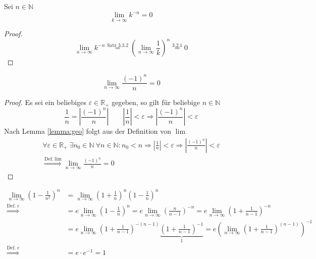 \documentclass[a4paper, 12pt]{scrartcl}
\newcommand{\defimpl}[1]{\stackrel{\text{Def.}\;#1}{\Longrightarrow}}
\begin{document}
\begin{lemma}\label{lemma:geo}
Sei $n \in \mathbb{N}$
\[ \lim_{k \rightarrow \infty} k^{-n} = 0 \]
\end{lemma}
\begin{proof}
\[ \lim_{n \rightarrow \infty} k^{-n} \stackrel{\text{Satz 3.3.2}}{=} \left( \lim_{n \rightarrow \infty} \frac{1}{k}  \right)^n \stackrel{3.2.1}{=} 0 \]
\end{proof}
\begin{lemma}\label{lemma:alternating}
	\[ \lim_{n \rightarrow \infty} \frac{(-1)^n}{n} = 0 \]
\end{lemma}
\begin{proof}
Es sei ein beliebiges $\varepsilon \in \mathbb{R}_+$ gegeben, so gilt für beliebige $n \in \mathbb{N}$
\[ \frac{1}{n} = \left| \frac{(-1)^n}{n} \right| \qquad \left|\frac{1}{n}\right| < \varepsilon \Rightarrow \left| \frac{(-1)^n}{n} \right| < \varepsilon \]
Nach Lemma \ref{lemma:geo} folgt aus der Definition von $\lim$
\begin{gather*}
	\forall \varepsilon \in \mathbb{R}_+\ \exists n_0 \in \mathbb{N}\ \forall n \in \mathbb{N} : n_0 < n \Rightarrow \left|\frac{1}{n}\right| < \varepsilon \Rightarrow \left|\frac{(-1)^n}{n}\right| < \varepsilon \\ 
	\defimpl{\lim} \lim_{n \rightarrow \infty} \frac{(-1)^n}{n} = 0
\end{gather*}
\end{proof}
\begin{align*}
	\lim_{n \rightarrow \infty} \left( 1 - \frac{1}{n^2} \right)^n &= \lim_{n \rightarrow \infty} \left( 1 + \frac{1}{n} \right)^n\left( 1 - \frac{1}{n} \right)^n \\
	\defimpl{e} \qquad &= e \lim_{n \rightarrow \infty} \left( 1 - \frac{1}{n} \right)^n = e\lim_{n \rightarrow \infty} \left( \frac{n}{n-1} \right)^{-n} = e\lim_{n \rightarrow \infty} \left( 1 + \frac{1}{n-1} \right)^{-n}\\
	&= e\lim_{n \rightarrow \infty} \left( 1 + \frac{1}{n-1} \right)^{-(n-1)}\underbrace{\left( 1 + \frac{1}{n-1} \right)^{-1}}_1 = e \left(\lim_{n \rightarrow \infty} \left( 1 + \frac{1}{n-1} \right)^{(n-1)}\right)^{-1} \\
	\defimpl{e} \qquad &= e \cdot e^{-1} = 1
\end{align*}
\end{document}
